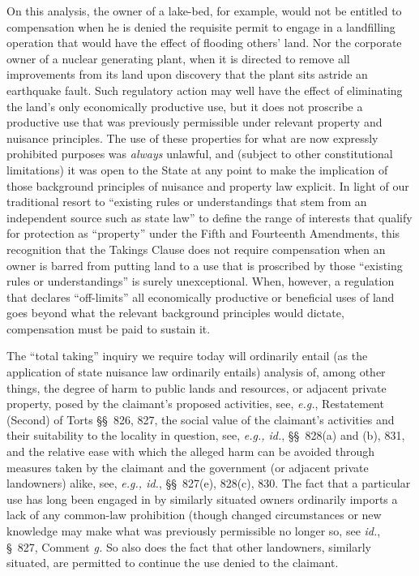 On this analysis, the owner of a lake-bed, for example, would not be entitled to
compensation when he is denied the requisite permit to engage in a landfilling
operation that would have the effect of flooding others' land. Nor the corporate
owner of a nuclear generating plant, when it is directed to remove all
improvements from its land upon discovery that the plant sits astride an
earthquake fault. Such regulatory action may well have the effect of eliminating
the land's only economically productive use, but it does not proscribe a
productive use that was previously permissible under relevant property and
nuisance principles. The use of these properties for what are now expressly
prohibited purposes was \textit{always} unlawful, and (subject to other
constitutional limitations) it was open to the State at any point to make the
implication of those background principles of nuisance and property law
explicit. In light of our traditional resort to ``existing rules or
understandings that stem from an independent source such as state law'' to
define the range of interests that qualify for protection as ``property'' under
the Fifth and Fourteenth Amendments, this recognition that the Takings Clause
does not require compensation when an owner is barred from putting land to a use
that is proscribed by those ``existing rules or understandings'' is surely
unexceptional. When, however, a regulation that declares ``off-limits'' all
economically productive or beneficial uses of land goes beyond what the relevant
background principles would dictate, compensation must be paid to sustain it.

The ``total taking'' inquiry we require today will ordinarily entail (as the
application of state nuisance law ordinarily entails) analysis of, among other
things, the degree of harm to public lands and resources, or adjacent private
property, posed by the claimant's proposed activities, see, \textit{e.g.},
Restatement (Second) of Torts \S\S~826, 827, the social value of the
claimant's activities and their suitability to the locality in question, see,
\textit{e.g., id.}, \S\S~828(a) and (b), 831, and the relative ease with which
the alleged harm can be avoided through measures taken by the claimant and the
government (or adjacent private landowners) alike, see, \textit{e.g., id.},
\S\S~827(e), 828(c), 830. The fact that a particular use has long been engaged
in by similarly situated owners ordinarily imports a lack of any common-law
prohibition (though changed circumstances or new knowledge may make what was
previously permissible no longer so, see \textit{id.}, \S~827, Comment
\textit{g.} So also does the fact that other landowners, similarly situated, are
permitted to continue the use denied to the claimant.

